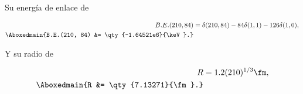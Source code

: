 \documentclass[./../main.tex]{subfiles}
\begin{document}
\begin{exercise}
\begin{solution}
\begin{itemize}
			Su energía de enlace de

			\begin{align*}
				B.E.(210, 84) &= \delta(210, 84) - 84\delta(1, 1) - 126\delta(1, 0),\\
				\Aboxedmain{B.E.(210, 84) &= \qty{-1.64521e6}{\keV}.}
			\end{align*}

			Y su radio de

			\begin{align*}
				R &= 1.2 (210)^{1/3}\unit{\fm},\\
				\Aboxedmain{R &= \qty{7.13271}{\fm}.}
			\end{align*}
		\end{itemize}
		\end{solution}
    \end{exercise}
\end{document}
